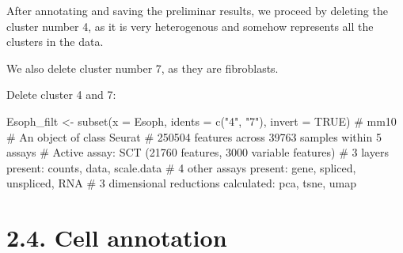\documentclass[
  letterpaper,
  DIV=11,
  numbers=noendperiod]{scrreprt}
\newenvironment{Shaded}{\begin{snugshade}}{\end{snugshade}}
\newcommand{\AttributeTok}[1]{\textcolor[rgb]{0.40,0.45,0.13}{#1}}
\newcommand{\CommentTok}[1]{\textcolor[rgb]{0.37,0.37,0.37}{#1}}
\newcommand{\ConstantTok}[1]{\textcolor[rgb]{0.56,0.35,0.01}{#1}}
\newcommand{\FunctionTok}[1]{\textcolor[rgb]{0.28,0.35,0.67}{#1}}
\newcommand{\NormalTok}[1]{\textcolor[rgb]{0.00,0.23,0.31}{#1}}
\newcommand{\OtherTok}[1]{\textcolor[rgb]{0.00,0.23,0.31}{#1}}
\newcommand{\StringTok}[1]{\textcolor[rgb]{0.13,0.47,0.30}{#1}}
\begin{document}
After annotating and saving the preliminar results, we proceed by
deleting the cluster number 4, as it is very heterogenous and somehow
represents all the clusters in the data.

We also delete cluster number 7, as they are fibroblasts.

Delete cluster 4 and 7:

\begin{Shaded}
\begin{Highlighting}[]
\NormalTok{Esoph\_filt }\OtherTok{\textless{}{-}} \FunctionTok{subset}\NormalTok{(}\AttributeTok{x =}\NormalTok{ Esoph, }\AttributeTok{idents =} \FunctionTok{c}\NormalTok{(}\StringTok{"4"}\NormalTok{, }\StringTok{"7"}\NormalTok{), }\AttributeTok{invert =} \ConstantTok{TRUE}\NormalTok{)}
\CommentTok{\# mm10}
\CommentTok{\# An object of class Seurat }
\CommentTok{\# 250504 features across 39763 samples within 5 assays }
\CommentTok{\# Active assay: SCT (21760 features, 3000 variable features)}
\CommentTok{\#  3 layers present: counts, data, scale.data}
\CommentTok{\#  4 other assays present: gene, spliced, unspliced, RNA}
\CommentTok{\#  3 dimensional reductions calculated: pca, tsne, umap}
\end{Highlighting}
\end{Shaded}

\section{2.4. Cell annotation}\label{cell-annotation}
\end{document}
